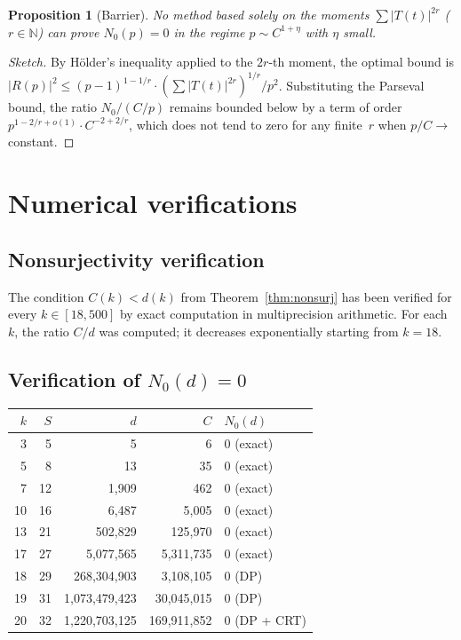\documentclass[12pt, a4paper]{amsart}
\theoremstyle{plain}
\newtheorem{proposition}[theorem]{Proposition}
\theoremstyle{definition}
\theoremstyle{remark}
\newcommand{\N}{\mathbb{N}}
\begin{document}
\begin{proposition}[Barrier]\label{prop:barrier}
  No method based solely on the moments
  $\sum |T(t)|^{2r}$ ($r \in \N$) can prove $N_0(p) = 0$ in the
  regime $p \sim C^{1+\eta}$ with $\eta$ small.
\end{proposition}

\begin{proof}[Sketch]
  By H\"older's inequality applied to the $2r$-th moment,
  the optimal bound is
  $|R(p)|^2 \leq (p-1)^{1-1/r} \cdot (\sum |T(t)|^{2r})^{1/r}
  / p^2$.
  Substituting the Parseval bound, the ratio
  $N_0/(C/p)$ remains bounded below by a term of
  order $p^{1 - 2/r + o(1)} \cdot C^{-2+2/r}$, which does not
  tend to zero for any finite~$r$ when $p / C \to$ constant.
\end{proof}

\section{Numerical verifications}\label{sec:numerical}

\subsection{Nonsurjectivity verification}

The condition $C(k) < d(k)$ from Theorem~\ref{thm:nonsurj}
has been verified for every $k \in [18, 500]$ by exact
computation in multiprecision arithmetic.
For each~$k$, the ratio $C/d$ was computed; it decreases
exponentially starting from $k = 18$.

\subsection{Verification of $N_0(d) = 0$}

\begin{center}
  \begin{tabular}{@{}rrrrl@{}}
    \toprule
    $k$ & $S$ & $d$ & $C$ & $N_0(d)$ \\
    \midrule
    3  & 5  & 5           & 6          & 0 (exact) \\
    5  & 8  & 13          & 35         & 0 (exact) \\
    7  & 12 & 1,909       & 462        & 0 (exact) \\
    10 & 16 & 6,487       & 5,005      & 0 (exact) \\
    13 & 21 & 502,829     & 125,970    & 0 (exact) \\
    17 & 27 & 5,077,565   & 5,311,735  & 0 (exact) \\
    18 & 29 & 268,304,903 & 3,108,105  & 0 (DP)   \\
    19 & 31 & 1,073,479,423 & 30,045,015 & 0 (DP)  \\
    20 & 32 & 1,220,703,125 & 169,911,852 & 0 (DP + CRT) \\
    \bottomrule
  \end{tabular}
\end{center}
\end{document}
